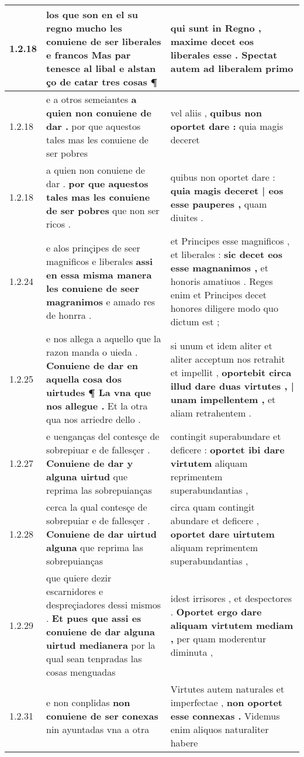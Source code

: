 \begin{tabular}{|p{1cm}|p{6.5cm}|p{6.5cm}|}
1.2.18 & los que son en el su regno \textbf{ mucho les conuiene de ser liberales e francos } Mas par tenesce al libal e alstan ço de catar tres cosas ¶ & qui sunt in Regno , \textbf{ maxime decet eos liberales esse . } Spectat autem ad liberalem primo \\\hline
1.2.18 & e a otros semeiantes \textbf{ a quien non conuiene de dar . } por que aquestos tales mas les conuiene de ser pobres & vel aliis , \textbf{ quibus non oportet dare : } quia magis deceret \\\hline
1.2.18 & a quien non conuiene de dar . \textbf{ por que aquestos tales mas les conuiene de ser pobres } que non ser ricos . & quibus non oportet dare : \textbf{ quia magis deceret | eos esse pauperes , } quam diuites . \\\hline
1.2.24 & e alos prinçipes de seer magnificos e liberales \textbf{ assi en essa misma manera les conuiene de seer magranimos } e amado res de honrra . & et Principes esse magnificos , et liberales : \textbf{ sic decet eos esse magnanimos , } et honoris amatiuos . Reges enim et Principes decet honores diligere modo quo dictum est ; \\\hline
1.2.25 & e nos allega a aquello que la razon manda o uieda . \textbf{ Conuiene de dar en aquella cosa dos uirtudes ¶ La vna que nos allegue . } Et la otra qua nos arriedre dello . & si unum et idem aliter et aliter acceptum nos retrahit et impellit , \textbf{ oportebit circa illud dare duas virtutes , | unam impellentem , } et aliam retrahentem . \\\hline
1.2.27 & e uenganças del contesçe de sobrepiuar e de fallesçer . \textbf{ Conuiene de dar y alguna uirtud } que reprima las sobrepuianças & contingit superabundare et deficere : \textbf{ oportet ibi dare virtutem } aliquam reprimentem superabundantias , \\\hline
1.2.28 & cerca la qual contesçe de sobrepuiar e de fallesçer . \textbf{ Conuiene de dar uirtud alguna } que reprima las sobrepuianças & circa quam contingit abundare et deficere , \textbf{ oportet dare uirtutem } aliquam reprimentem superabundantias , \\\hline
1.2.29 & que quiere dezir escarnidores e despreçiadores dessi mismos . \textbf{ Et pues que assi es conuiene de dar alguna uirtud medianera } por la qual sean tenpradas las cosas menguadas & idest irrisores , et despectores . \textbf{ Oportet ergo dare aliquam virtutem mediam , } per quam moderentur diminuta , \\\hline
1.2.31 & e non conplidas \textbf{ non conuiene de ser conexas } nin ayuntadas vna a otra & Virtutes autem naturales et imperfectae , \textbf{ non oportet esse connexas . } Videmus enim aliquos naturaliter habere \\\hline

\end{tabular}
